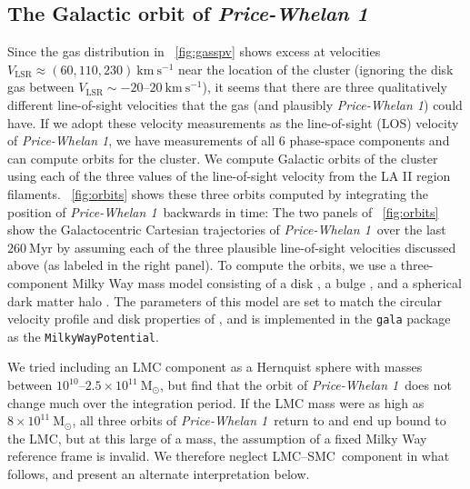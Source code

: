 \documentclass[twocolumn]{aastex62}
\newcommand{\msun}{\textrm{M}_\odot}
\newcommand{\kms}{\ensuremath{\textrm{km}~\textrm{s}^{-1}}}
\newcommand{\clustername}{\textsl{Price-Whelan 1}}
\newcommand{\lmcsmc}{LMC--SMC}
\begin{document}
\subsection{The Galactic orbit of \clustername}
\label{sec:orbit}

Since the gas distribution in \figurename~\ref{fig:gasspv} shows excess at velocities $V_{\textrm{LSR}} \approx (60, 110, 230)~\kms$ near the location of the cluster (ignoring the disk gas between $V_{\textrm{LSR}} \sim -20$--$20~\kms$), it seems that there are three qualitatively different line-of-sight velocities that the gas (and plausibly \clustername) could have.
If we adopt these velocity measurements as the line-of-sight (LOS) velocity of \clustername, we have measurements of all 6 phase-space components and can compute orbits for the cluster.
We compute Galactic orbits of the cluster using each of the three values of the line-of-sight velocity from the LA II region filaments.
\figurename~\ref{fig:orbits} shows these three orbits computed by integrating the position of \clustername\ backwards in time:
The two panels of \figurename~\ref{fig:orbits} show the Galactocentric Cartesian trajectories of \clustername\ over the last $260~\textrm{Myr}$ by assuming each of the three plausible line-of-sight velocities discussed above (as labeled in the right panel).
To compute the orbits, we use a three-component Milky Way mass model consisting of a disk \citep{Miyamoto:1975}, a bulge \citep{Hernquist:1990}, and a spherical dark matter halo \citep{Navarro:1996}.
The parameters of this model are set to match the circular velocity profile and disk properties of \citet{Bovy:2015}, and is implemented in the \texttt{gala} package \citep{gala} as the \texttt{MilkyWayPotential}.

We tried including an LMC component as a Hernquist sphere \citep{Hernquist:1990} with masses between $10^{10}$--$2.5\times 10^{11}~\msun$, but find that the orbit of \clustername\ does not change much over the integration period.
If the LMC mass were as high as $8\times 10^{11}~\msun$, all three orbits of \clustername\ return to and end up bound to the LMC, but at this large of a mass, the assumption of a fixed Milky Way reference frame is invalid.
We therefore neglect \lmcsmc\ component in what follows, and present an alternate interpretation below.
\end{document}
